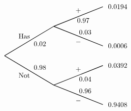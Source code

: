 \documentclass[11pt,letterpaper]{article}
\begin{document}
		\[
		\begin{tikzpicture}[scale= 1.0]
		\def\FirstUpLabel{Has}
		\def\FirstDownLabel{Not}
		\def\SecondUpLabel{$+$}
		\def\SecondDownLabel{$-$}
		\def\Up{$0.02$}
		\def\Down{$0.98$}
		\def\UpUp{$0.97$}
		\def\UpDown{$0.03$}
		\def\DownUp{$0.04$}
		\def\DownDown{$0.96$}
		\def\first{$0.0194$}
		\def\second{$0.0006$}
		\def\third{$0.0392$}
		\def\fourth{$0.9408$}
		
		\node at (1,1) {\FirstUpLabel};	
		\node at (1,-1) {\FirstDownLabel};	
		\node at (1.8,0.6) {\Up};
		\node at (1.8,-0.6) {\Down};
		\draw[thick] (0,0) -- (2.5,1.5);
		\draw[thick] (0,0) -- (2.5,-1.5);
		
		\node at (3.75,2.3) {\SecondUpLabel};
		\node at (3.75,0.7) {\SecondDownLabel};
		\node at (4,1.8) {\UpUp};
		\node at (4.1,1.2) {\UpDown};
		\node at (5.75,2.5) {\first};
		\node at (5.75,0.5) {\second};
		\draw[thick] (2.5,1.5) -- (5,2.5);
		\draw[thick] (2.5,1.5) -- (5,0.5);

		\node at (3.75,-0.7) {\SecondUpLabel};
		\node at (3.75,-2.3) {\SecondDownLabel};
		\node at (4.1,-1.2) {\DownUp};
		\node at (4.1,-1.8) {\DownDown};
		\node at (5.75,-0.5) {\third};	
		\node at (5.75,-2.5) {\fourth};	
		\draw[thick] (2.5,-1.5) -- (5,-0.5);
		\draw[thick] (2.5,-1.5) -- (5,-2.5);
		\end{tikzpicture}
		\]
\end{document}
